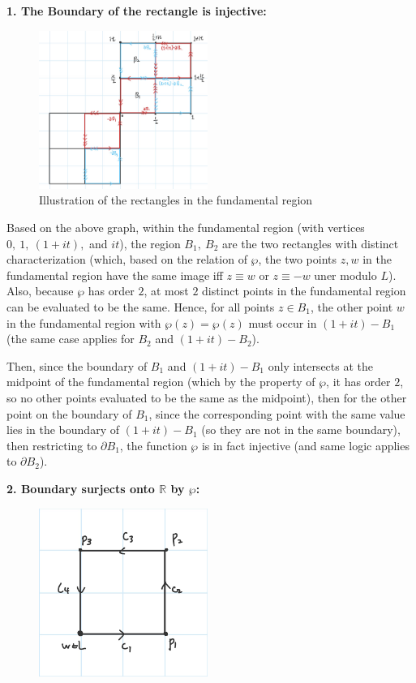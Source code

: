 \documentclass{article}
\begin{document}
\begin{itemize}
    \textbf{1. The Boundary of the rectangle is injective:}
    
    \begin{figure}[h!]
        \begin{center}
            \includegraphics*[width=55mm]{image 1.jpg}
            \caption{Illustration of the rectangles in the fundamental region}
        \end{center}
    \end{figure}

    Based on the above graph, within the fundamental region (with vertices $0,\ 1,\ (1+it),$ and $it$), the region $B_1,\ B_2$ are the two rectangles with distinct characterization (which, based on the relation of $\wp$, the two points $z,w$ in the fundamental region have the same image iff $z\equiv w$ or $z\equiv -w$ uner modulo $L$). Also, because $\wp$ has order $2$, at most $2$ distinct points in the fundamental region can be evaluated to be the same. Hence, for all points $z\in B_1$, the other point $w$ in the fundamental region with $\wp(z)=\wp(z)$ must occur in $(1+it)-B_1$ (the same case applies for $B_2$ and $(1+it)-B_2$).

    Then, since the boundary of $B_1$ and $(1+it)-B_1$ only intersects at the midpoint of the fundamental region (which by the property of $\wp$, it has order $2$, so no other points evaluated to be the same as the midpoint), then for the other point on the boundary of $B_1$, since the corresponding point with the same value lies in the boundary of $(1+it)-B_1$ (so they are not in the same boundary), then restricting to $\partial B_1$, the function $\wp$ is in fact injective (and same logic applies to $\partial B_2$).

    \hfil

    \textbf{2. Boundary surjects onto $\mathbb{R}$ by $\wp$:}

    \begin{figure}[h!]
        \begin{center}
            \includegraphics*[width=55mm]{image 2.jpg}
        \end{center}
    \end{figure}


\end{itemize}
\end{document}
